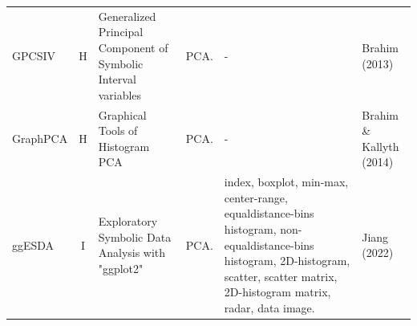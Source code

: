 \documentclass[article]{jss}
\begin{document}
\begin{table}[htbp]
\begin{tabular}{|l|c|p{13.19em}|p{21em}|p{16.5em}|l|}
    GPCSIV & H     & Generalized Principal Component of Symbolic Interval variables & PCA.  & -     & Brahim (2013) \\
    GraphPCA & H     & Graphical Tools of Histogram PCA & PCA.  & -     & Brahim \& Kallyth (2014) \\
    ggESDA & I     & Exploratory Symbolic Data Analysis with "ggplot2" & PCA.  & index, boxplot, min-max, center-range, equaldistance-bins histogram, non-equaldistance-bins histogram, 2D-histogram, scatter, scatter matrix, 2D-histogram matrix, radar, data image. & Jiang (2022) \\
    \hline
    \end{tabular}%
  \label{tab:addlabel}%
\end{table}%





\newpage
\clearpage
\end{document}
